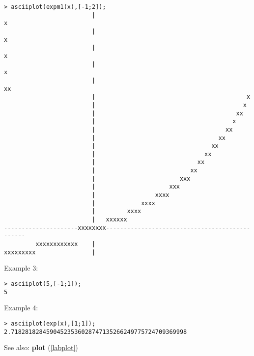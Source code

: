 \begin{center}\begin{minipage}{15cm}\begin{Verbatim}[frame=single]
> asciiplot(expm1(x),[-1;2]);
                         |                                                 x
                         |                                                x 
                         |                                               x  
                         |                                              x   
                         |                                            xx    
                         |                                           x      
                         |                                          x       
                         |                                        xx        
                         |                                       x          
                         |                                     xx           
                         |                                   xx             
                         |                                 xx               
                         |                               xx                 
                         |                             xx                   
                         |                           xx                     
                         |                        xxx                       
                         |                     xxx                          
                         |                 xxxx                             
                         |             xxxx                                 
                         |         xxxx                                     
                         |   xxxxxx                                         
---------------------xxxxxxxx-----------------------------------------------
         xxxxxxxxxxxx    |                                                  
xxxxxxxxx                |                                                  
\end{Verbatim}
\end{minipage}\end{center}
\noindent Example 3: 
\begin{center}\begin{minipage}{15cm}\begin{Verbatim}[frame=single]
> asciiplot(5,[-1;1]);
5
\end{Verbatim}
\end{minipage}\end{center}
\noindent Example 4: 
\begin{center}\begin{minipage}{15cm}\begin{Verbatim}[frame=single]
> asciiplot(exp(x),[1;1]);
2.71828182845904523536028747135266249775724709369998
\end{Verbatim}
\end{minipage}\end{center}
See also: \textbf{plot} (\ref{labplot})
